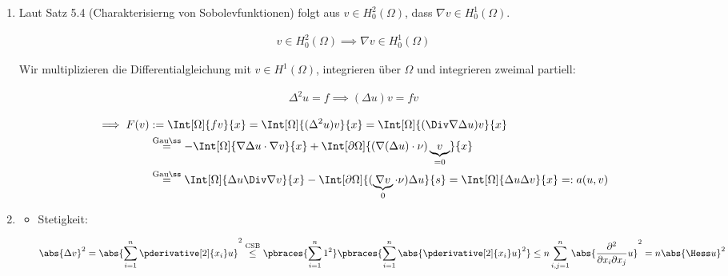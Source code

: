 \begin{solution}

\phantom{}

\begin{enumerate}[label = (\alph*)]

  \item Laut Satz 5.4 (Charakterisierng von Sobolevfunktionen) folgt aus $v \in H_0^2(\Omega)$, dass $\nabla v \in H_0^1(\Omega)$.

  \begin{align*}
    v \in H_0^2(\Omega)
    \implies
    \nabla v \in H_0^1(\Omega)
  \end{align*}

  Wir multiplizieren die Differentialgleichung mit $v \in H^1(\Omega)$, integrieren über $\Omega$ und integrieren zweimal partiell:

  \begin{align*}
    \Delta^2 u = f
    \implies
    (\Delta u) v = f v
  \end{align*}

  \begin{align*}
    \implies
    F(v)
    & :=
    \Int[\Omega]{f v}{x}
    =
    \Int[\Omega]{(\Delta^2 u) v}{x}
    =
    \Int[\Omega]{(\Div \nabla \Delta u) v}{x} \\
    & \stackrel
    {
      \mathrm{Gauß}
    }{=}
    -\Int[\Omega]{\nabla \Delta u \cdot \nabla v}{x}
    +
    \Int[\partial \Omega]{(\nabla (\Delta u) \cdot \nu) \underbrace{v}_{=0}}{x} \\
    & \stackrel
    {
      \mathrm{Gauß}
    }{=}
    \Int[\Omega]{\Delta u \Div \nabla v}{x}
    -
    \Int[\partial \Omega]{(\underbrace{\nabla v}_0 \cdot \nu) \Delta u}{s}
    =
    \Int[\Omega]{\Delta u \Delta v}{x}
    =:
    a(u, v)
  \end{align*}

  \item

  \begin{itemize}
    \item Stetigkeit:

    \begin{align*}
      \abs{\Delta v}^2
      =
      \abs
      {
        \sum_{i=1}^n
        \pderivative[2]{x_i} u
      }^2
      \stackrel
      {
        \mathrm{CSB}
      }{\leq}
      \pbraces
      {
        \sum_{i=1}^n
        1^2
      }
      \pbraces
      {
        \sum_{i=1}^n
        \abs{\pderivative[2]{x_i} u}^2
      }
      \leq
      n
      \sum_{i,j=1}^n
      \abs
      {
        \frac{\partial^2}{\partial x_i \partial x_j} u
      }^2
      =
      n \abs{\Hess u}^2
    \end{align*}


\end{itemize}
\end{enumerate}
\end{solution}
